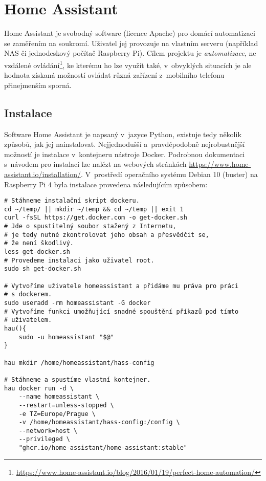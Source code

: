 \section{Home Assistant}
Home Assistant je svobodný software (licence Apache) pro domácí automatizaci se
zaměřením na soukromí. Uživatel jej provozuje na vlastním serveru (například
NAS či jednodeskový počítač Raspberry Pi). Cílem projektu je
\emph{automatizace}, ne vzdálené
ovládání\footnote{\url{https://www.home-assistant.io/blog/2016/01/19/perfect-home-automation/}},
ke kterému ho lze využít také, v~obvyklých situacích je ale hodnota získaná
možností ovládat různá zařízení z~mobilního telefonu přinejmenším sporná.

\subsection{Instalace}
Software Home Assistant je napsaný v~jazyce Python, existuje tedy několik
způsobů, jak jej nainstalovat. Nejjednodušší a~pravděpodobně nejrobustnější
možností je instalace v~kontejneru nástroje Docker. Podrobnou dokumentaci
s~návodem pro instalaci lze nalézt na webových stránkách
\url{https://www.home-assistant.io/installation/}.
V~prostředí operačního systému Debian 10 (buster) na Raspberry Pi 4 byla
instalace provedena následujícím způsobem:
\begin{lstlisting}[language=mybash]
# Stáhneme instalační skript dockeru.
cd ~/temp/ || mkdir ~/temp && cd ~/temp || exit 1
curl -fsSL https://get.docker.com -o get-docker.sh
# Jde o spustitelný soubor stažený z Internetu,
# je tedy nutné zkontrolovat jeho obsah a přesvědčit se,
# že není škodlivý.
less get-docker.sh
# Provedeme instalaci jako uživatel root.
sudo sh get-docker.sh

# Vytvoříme uživatele homeassistant a přidáme mu práva pro práci
# s dockerem.
sudo useradd -rm homeassistant -G docker
# Vytvoříme funkci umožňující snadné spouštění příkazů pod tímto
# uživatelem.
hau(){
    sudo -u homeassistant "$@"
}

hau mkdir /home/homeassistant/hass-config

# Stáhneme a spustíme vlastní kontejner.
hau docker run -d \
    --name homeassistant \
    --restart=unless-stopped \
    -e TZ=Europe/Prague \
    -v /home/homeassistant/hass-config:/config \
    --network=host \
    --privileged \
    "ghcr.io/home-assistant/home-assistant:stable"
\end{lstlisting}

